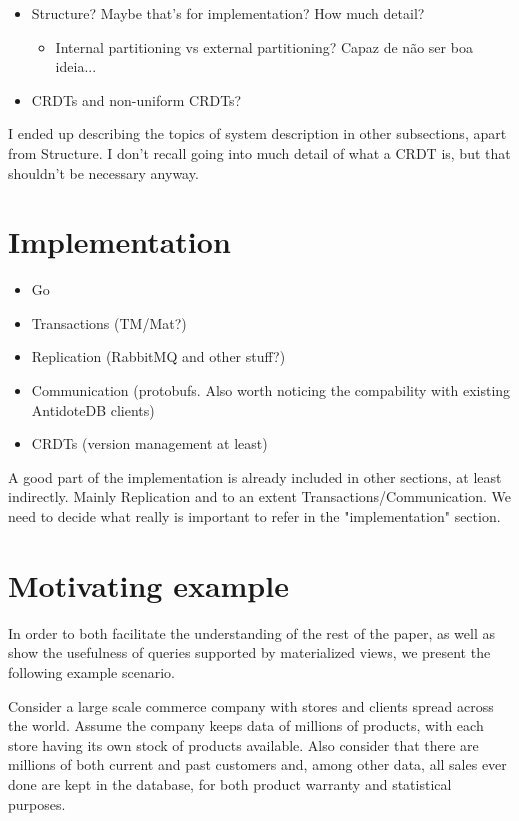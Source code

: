 \documentclass{vldb}
\newcommand{\grumbler}[2]{{\color{red}{\bf #1:} #2}}
\newcommand{\andre}[1]{\grumbler{andre}{#1}}
\begin{document}
\begin{itemize}
\item Structure? Maybe that's for implementation? How much detail?
\begin{itemize}
	\item Internal partitioning vs external partitioning? Capaz de não ser boa ideia...	
\end{itemize}
\item CRDTs and non-uniform CRDTs?
\end{itemize}

\andre{I ended up describing the topics of system description in other subsections, apart from Structure. I don't recall going into much detail of what a CRDT is, but that shouldn't be necessary anyway.}

\section{Implementation}

\begin{itemize}
	\item Go
	\item Transactions (TM/Mat?)
	\item Replication (RabbitMQ and other stuff?)
	\item Communication (protobufs. Also worth noticing the compability with existing AntidoteDB clients)
	\item CRDTs (version management at least)
\end{itemize}

\andre{A good part of the implementation is already included in other sections, at least indirectly. Mainly Replication and to an extent Transactions/Communication. We need to decide what really is important to refer in the "implementation" section.}

\null\newpage

\section{Motivating example}
\label{sec:example}

In order to both facilitate the understanding of the rest of the paper, as well as show the usefulness of queries supported by materialized views, we present the following example scenario.

Consider a large scale commerce company with stores and clients spread across the world.
Assume the company keeps data of millions of products, with each store having its own stock of products available.
Also consider that there are millions of both current and past customers and, among other data, all sales ever done are kept in the database, for both product warranty and statistical purposes.
\end{document}
